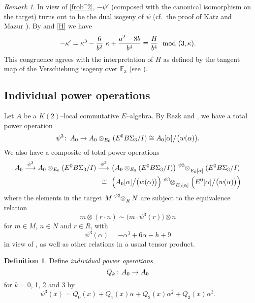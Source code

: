 \documentclass[microtype]{gtpart}     %
\theoremstyle{remark}
\newtheorem{rmk}{Remark}[section]
\theoremstyle{definition}
\newtheorem{defn}{Definition}[section]
\def\co{\colon\thinspace}
\newcommand{\mb}[1]{\mathbb{#1}}
\newcommand{\BF}{{\mb F}}
\newcommand{\md}{~~{\rm mod}~}
\newcommand{\A}{\alpha}
\newcommand{\K}{\kappa}
\newcommand{\p}{\psi^3}
\begin{document}
\begin{rmk}
\label{rmk:K'}
 In view of \eqref{frob^2}, $-\psi'$ (composed with the canonical isomorphism 
 on the target) turns out to be the dual isogeny of $\psi$ (cf.~the proof of 
 Katz and Mazur \cite[Theorem 2.9.4]{KM}).  By  and \eqref{H} 
 we have 
 \[
  -\K' = \K^3 - \frac{6}{b^2} ~ \K + \frac{a^2 - 8 b}{b^4} \equiv \frac{H}{b^4} \md (3,\K).  
 \]
 This congruence agrees with the interpretation of $H$ as defined by the 
 tangent map of the Verschiebung isogeny over $\BF_3$ (see 
 \cite[12.4.1]{KM}).  
\end{rmk}


\subsection{Individual power operations}

Let $A$ be a $K(2)$--local commutative $E$--algebra.  By Rezk 
\cite[3.23]{cong} and , we have a total power operation 
\[
 \p \co A_0 \to A_0 \otimes_{E_0} (E^0 B\Sigma_3 / I) \cong A_0 [\A] \big/ \big( w(\A) \big).  
\]
We also have a composite of total power operations 
\begin{equation}
\label{psi3^2}
\begin{split}
 A_0 \stackrel{\p}{\longrightarrow} A_0 \otimes_{E_0} (E^0 B\Sigma_3 / I) \stackrel{\p}{\longrightarrow} 
 & ~ \big( A_0 \otimes_{E_0} (E^0 B\Sigma_3 / I) \big) \tensor[^\p]{\otimes}{_{E_0 [\A]}} (E^0 B\Sigma_3 / I) \\
 \cong \thinspace \thinspace & ~ \Big( A_0 [\A] \big/ \big( w(\A) \big) \Big) \tensor[^\p]{\otimes}{_{E_0 [\A]}} \Big( E^0 [\A] \big/ \big( w(\A) \big) \Big) 
\end{split}
\end{equation}
where the elements in the target $M \tensor[^\p]{\otimes}{_R} N$ are subject 
to the equivalence relation 
\[
 m \otimes (r \cdot n) \sim \big( m \cdot \p(r) \big) \otimes n 
\]
for $m \in M$, $n \in N$ and $r \in R$, with 
\[
 \p(\A) = -\A^3 + 6 \A - h + 9 
\]
in view of , as well as other relations in a usual tensor 
product.  

\begin{defn}
\label{def:Q}
 Define {\em individual power operations} 
 \[
  Q_k \co A_0 \to A_0 
 \]
 for $k = 0$, 1, 2 and 3 by 
 \[
  \p (x) = Q_0(x) + Q_1(x) \A + Q_2(x) \A^2 + Q_3(x) \A^3.  
 \]
\end{defn}
\end{document}
